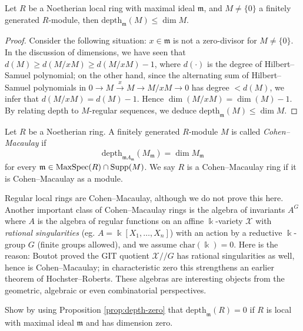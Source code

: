 \begin{corollary}
	Let $R$ be a Noetherian local ring with maximal ideal $\mathfrak{m}$, and $M \neq \{0\}$ a finitely generated $R$-module, then $\mathrm{depth}_{\mathfrak{m}}(M) \leq \dim M$.
\end{corollary}
\begin{proof}
	Consider the following situation: $x \in \mathfrak{m}$ is not a zero-divisor for $M \neq \{0\}$. In the discussion of dimensions, we have seen that $d(M) \geq d(M/xM) \geq d(M/xM)-1$, where $d(\cdot)$ is the degree of Hilbert--Samuel polynomial; on the other hand, since the alternating sum of Hilbert--Samuel polynomials in $0 \to M \xrightarrow{x} M \to M/xM \to 0$ has degree $< d(M)$, we infer that $d(M/xM) = d(M) - 1$. Hence $\dim(M/xM) = \dim(M) - 1$. By relating depth to $M$-regular sequences, we deduce $\text{depth}_{\mathfrak{m}}(M) \leq \dim M$.
\end{proof}

\begin{definition}
	Let $R$ be a Noetherian ring. A finitely generated $R$-module $M$ is called \emph{Cohen--Macaulay} if
	\[ \mathrm{depth}_{\mathfrak{m}A_{\mathfrak{m}} }(M_{\mathfrak{m}}) = \dim M_{\mathfrak{m}} \]
	for every $\mathfrak{m} \in \operatorname{MaxSpec}(R) \cap \operatorname{Supp}(M)$. We say $R$ is a Cohen--Macaulay ring if it is Cohen--Macaulay as a module.
\end{definition}

\begin{example}
	Regular local rings are Cohen--Macaulay, although we do not prove this here. Another important class of Cohen--Macaulay rings is the algebra of invariants $A^G$ where $A$ is the algebra of regular functions on an affine $\Bbbk$-variety $\mathcal{X}$ with \emph{rational singularities} (eg. $A = \Bbbk[X_1, \ldots, X_n]$) with an action by a reductive $\Bbbk$-group $G$ (finite groups allowed), and we assume $\text{char}(\Bbbk)=0$. Here is the reason: Boutot \cite{Bou87} proved the GIT quotient $\mathcal{X}/\!/G$ has rational singularities as well, hence is Cohen--Macaulay; in characteristic zero this strengthens an earlier theorem of Hochster--Roberts. These algebras are interesting objects from the geometric, algebraic or even combinatorial perspectives.
\end{example}

\begin{exercise}
	Show by using Proposition \ref{prop:depth-zero} that $\text{depth}_{\mathfrak{m}}(R) = 0$ if $R$ is local with maximal ideal $\mathfrak{m}$ and has dimension zero.
\end{exercise}

